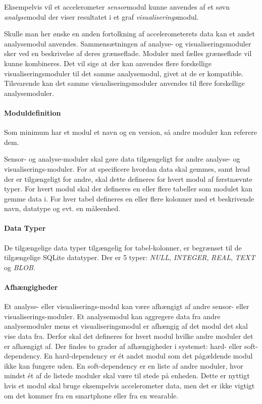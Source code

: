 Eksempelvis vil et accelerometer \textit{sensor}modul kunne anvendes af et søvn \textit{analyse}modul der viser resultatet i et graf \textit{visualiserings}modul.

Skulle man her ønske en anden fortolkning af accelerometerets data kan et andet analysemodul anvendes.
Sammensætningen af analyse- og visualiseringsmoduler sker ved en beskrivelse af deres grænseflade.
Moduler med fælles grænseflade vil kunne kombineres.
Det vil sige at der kan anvendes flere forskellige visualiseringsmoduler til det samme analysemodul, givet at de er kompatible.
Tilsvarende kan det samme visualiseringsmoduler anvendes til flere forskellige analysemoduler.

\paragraph{Moduldefinition}
Som minimum har et modul et navn og en version, så andre moduler kan referere dem.

Sensor- og analyse-moduler skal gøre data tilgængeligt for andre analyse- og visualiserings-moduler.
For at specificere hvordan data skal gemmes, samt hvad der er tilgængeligt for andre, skal dette defineres for hvert modul af førstnævnte typer.
For hvert modul skal der defineres en eller flere tabeller som modulet kan gemme data i.
For hver tabel defineres en eller flere kolonner med et beskrivende navn, datatype og evt. en måleenhed.

\paragraph{Data Typer}
De tilgængelige data typer tilgængelig for tabel-kolonner, er begrænset til de tilgængelige SQLite datatyper.
Der er 5 typer: \textit{NULL}, \textit{INTEGER}, \textit{REAL}, \textit{TEXT} og \textit{BLOB}.

\paragraph{Afhængigheder}
Et analyse- eller visualiserings-modul kan være afhængigt af andre sensor- eller visualiserings-moduler.
Et analysemodul kan aggregere data fra andre analysemoduler mens et visualiseringsmodul er afhængig af det modul det skal vise data fra.
Derfor skal det defineres for hvert modul hvilke andre moduler det er afhængigt af.
Der findes to grader af afhængigheder i systemet: hard- eller soft-dependency.
En hard-dependency er ét andet modul som det pågældende modul ikke kan fungere uden.
En soft-dependency er en liste af andre moduler, hvor mindst ét af de listede moduler skal være til stede på enheden.
Dette er nyttigt hvis et modul skal bruge eksempelvis accelerometer data, men det er ikke vigtigt om det kommer fra en smartphone eller fra en wearable.

